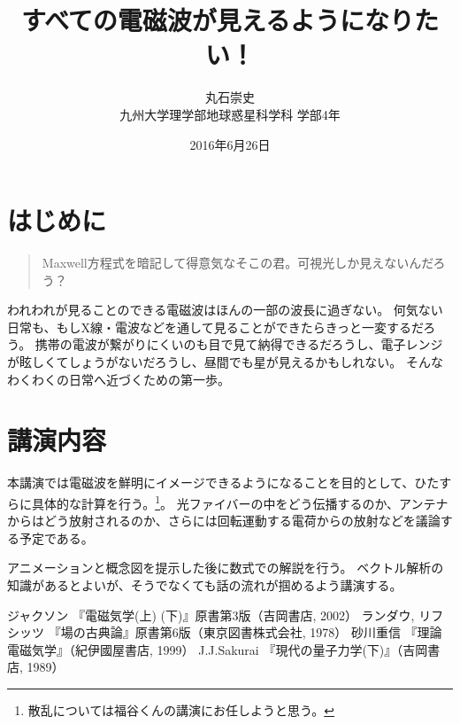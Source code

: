 \documentclass[12pt]{jsarticle}
\title{すべての電磁波が見えるようになりたい！}%
\author{丸石崇史\\%
{\small
九州大学理学部地球惑星科学科 学部4年　%
}}
\date{2016年6月26日}%
\begin{document}
\maketitle
\thispagestyle{fancy}
\section{はじめに}
\begin{quotation}
Maxwell方程式を暗記して得意気なそこの君。可視光しか見えないんだろう？
\end{quotation}
われわれが見ることのできる電磁波はほんの一部の波長に過ぎない。 何気ない日常も、もしX線・電波などを通して見ることができたらきっと一変するだろう。
携帯の電波が繋がりにくいのも目で見て納得できるだろうし、電子レンジが眩しくてしょうがないだろうし、昼間でも星が見えるかもしれない。
そんなわくわくの日常へ近づくための第一歩。

\section{講演内容}
本講演では電磁波を鮮明にイメージできるようになることを目的として、ひたすらに具体的な計算を行う。\footnote{散乱については福谷くんの講演にお任しようと思う。}。
光ファイバーの中をどう伝播するのか、アンテナからはどう放射されるのか、さらには回転運動する電荷からの放射などを議論する予定である。

アニメーションと概念図を提示した後に数式での解説を行う。 ベクトル解析の知識があるとよいが、そうでなくても話の流れが掴めるよう講演する。

\begin{thebibliography}{9}%
 ジャクソン 『電磁気学(上) (下)』原書第3版（吉岡書店, 2002）
 ランダウ, リフシッツ 『場の古典論』原書第6版（東京図書株式会社, 1978）
 砂川重信 『理論電磁気学』（紀伊國屋書店, 1999）
 J.J.Sakurai 『現代の量子力学(下)』（吉岡書店, 1989）
\end{thebibliography}
\end{document}
